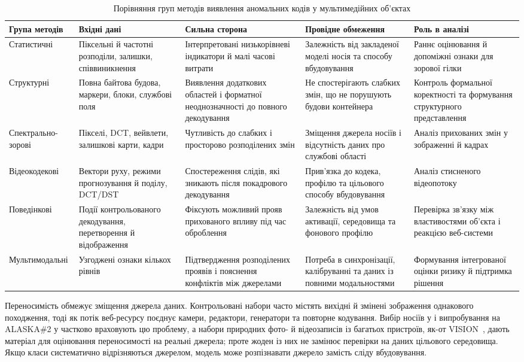 \begin{table}[H]
\caption{Порівняння груп методів виявлення аномальних кодів у мультимедійних об’єктах}
\label{tab:detection_comparison}
\centering
\scriptsize
\begin{tabularx}{\textwidth}{>{\raggedright\arraybackslash}p{}>{\raggedright\arraybackslash}p{}>{\raggedright\arraybackslash}p{}YY}
\toprule
\textbf{Група методів} & \textbf{Вхідні дані} & \textbf{Сильна сторона} & \textbf{Провідне обмеження} & \textbf{Роль в аналізі} \\
\midrule
Статистичні & Піксельні й частотні розподіли, залишки, співвиникнення & Інтерпретовані низькорівневі індикатори й малі часові витрати & Залежність від закладеної моделі носія та способу вбудовування & Раннє оцінювання й допоміжні ознаки для зорової гілки \\
Структурні & Повна байтова будова, маркери, блоки, службові поля & Виявлення додаткових областей і форматної неоднозначності до повного декодування & Не спостерігають слабких змін, що не порушують будови контейнера & Контроль формальної коректності та формування структурного представлення \\
Спектрально-зорові & Пікселі, DCT, вейвлети, залишкові карти, кадри & Чутливість до слабких і просторово розподілених змін & Зміщення джерела носіїв і відсутність даних про службові області & Аналіз прихованих змін у зображенні й кадрах \\
Відеокодекові & Вектори руху, режими прогнозування й поділу, DCT/DST & Спостереження слідів, які зникають після покадрового декодування & Прив’язка до кодека, профілю та цільового способу вбудовування & Аналіз стисненого відеопотоку \\
Поведінкові & Події контрольованого декодування, перетворення й відображення & Фіксують можливий прояв прихованого впливу під час оброблення & Залежність від умов активації, середовища та фонового профілю & Перевірка зв’язку між властивостями об’єкта і реакцією веб-системи \\
Мультимодальні & Узгоджені ознаки кількох рівнів & Підтвердження розподілених проявів і пояснення конфліктів між джерелами & Потреба в синхронізації, калібруванні та даних із повними модальностями & Формування інтегрованої оцінки ризику й підтримка рішення \\
\bottomrule
\end{tabularx}
\end{table}

Переносимість обмежує зміщення джерела даних. Контрольовані набори часто містять вихідні й змінені зображення однакового походження, тоді як потік веб-ресурсу поєднує камери, редактори, генератори та повторне кодування. Вибір носіїв у \cite{ma2023coverselection} і випробування на ALASKA\#2 у \cite{xie2023selfattention} частково враховують цю проблему, а набори природних фото- й відеозаписів із багатьох пристроїв, як-от VISION~\cite{shullani2017vision}, дають матеріал для оцінювання переносимості на реальні джерела; проте жоден із них не замінює перевірки на даних цільового середовища. Якщо класи систематично відрізняються джерелом, модель може розпізнавати джерело замість сліду вбудовування.

